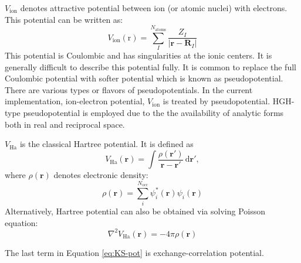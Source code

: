 $V_{\mathrm{ion}}$ denotes attractive potential between ion (or atomic nuclei)
with electrons. This potential can be written as:
\begin{equation}
V_{\mathrm{ion}}(\mathrm{r}) =
\sum_{I}^{N_{\mathrm{atoms}}}
\frac{Z_{I}}{ \left| \mathbf{r} - \mathbf{R}_{I} \right| }
\end{equation}
This potential is Coulombic and has singularities
at the ionic centers. It is generally difficult to describe this
potential fully. It is common to replace the full Coulombic potential
with softer potential which is known as pseudopotential.
There are various types or flavors of pseudopotentials.
In the current implementation, ion-electron potential, $V_{\mathrm{ion}}$
is treated by pseudopotential. HGH-type pseudopotential is employed due to the
the availability of analytic forms both in real and reciprocal space.

$V_{\mathrm{Ha}}$ is the classical Hartree potential. It is defined as
\begin{equation}
V_{\mathrm{Ha}}(\mathbf{r}) = \int
\frac{\rho(\mathbf{r}')}
{\mathbf{r} - \mathbf{r}'}\,\mathrm{d}\mathbf{r}',
\end{equation}
where $\rho(\mathbf{r})$ denotes electronic density:
\begin{equation}
\rho(\mathbf{r}) = \sum_{i}^{N_{\mathrm{occ}}}
\psi^{*}_{i}(\mathbf{r}) \psi_{i}(\mathbf{r})
\end{equation}
Alternatively, Hartree potential can also be obtained via solving Poisson equation:
\begin{equation}
\nabla^{2} V_{\mathrm{Ha}}(\mathbf{r}) = -4\pi \rho(\mathbf{r})
\end{equation}

The last term in Equation \eqref{eq:KS-pot} is exchange-correlation potential.

